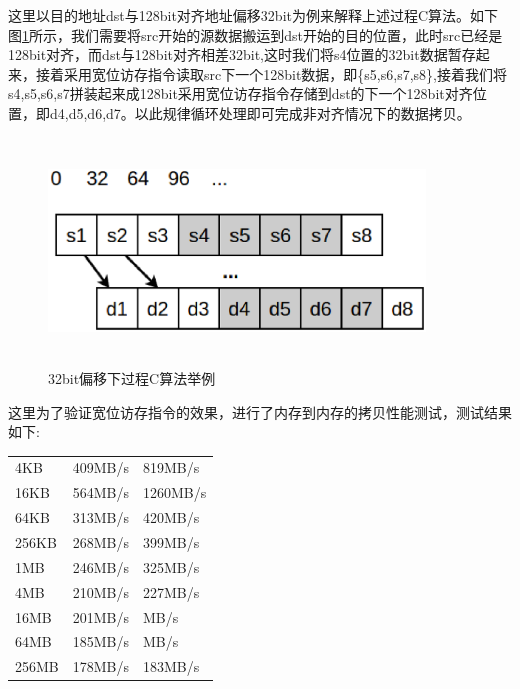 这里以目的地址dst与128bit对齐地址偏移32bit为例来解释上述过程C算法。如下图\ref{fig:offset32}所示，我们需要将src开始的源数据搬运到dst开始的目的位置，此时src已经是128bit对齐，而dst与128bit对齐相差32bit,这时我们将s4位置的32bit数据暂存起来，接着采用宽位访存指令读取src下一个128bit数据，即\{s5,s6,s7,s8\},接着我们将s4,s5,s6,s7拼装起来成128bit采用宽位访存指令存储到dst的下一个128bit对齐位置，即{d4,d5,d6,d7}。以此规律循环处理即可完成非对齐情况下的数据拷贝。


\begin{figure}[H] 
  \centering
  \includegraphics[width=10cm,height=6cm]{figures/chap03/offset32}
  \caption{32bit偏移下过程C算法举例}
  \label{fig:offset32}
\end{figure}

这里为了验证宽位访存指令的效果，进行了内存到内存的拷贝性能测试，测试结果如下:

\begin{center}  
\tablelasttail{\bottomrule}

\begin{supertabular}{p{6.cm}<{\centering}p{3.cm}<{\centering}m{6.cm}<{\centering}}
	4KB& 409MB/s& 819MB/s\\
	16KB& 564MB/s& 1260MB/s\\
	64KB& 313MB/s& 420MB/s\\
	256KB& 268MB/s& 399MB/s\\
	1MB& 246MB/s& 325MB/s\\
	4MB& 210MB/s& 227MB/s\\
	16MB& 201MB/s& MB/s\\
	64MB& 185MB/s& MB/s\\
	256MB& 178MB/s& 183MB/s\\
\end{supertabular}
\end{center}

